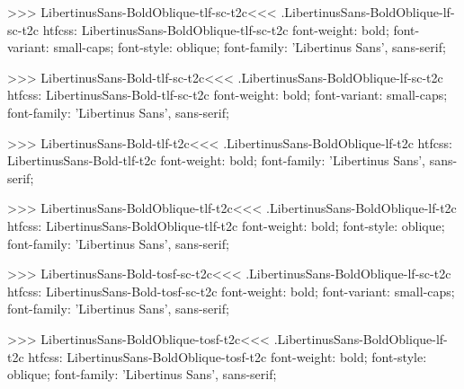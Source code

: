 {{{{{{{{{{>>>
\<LibertinusSans-BoldOblique-tlf-sc-t2c\><<<
.LibertinusSans-BoldOblique-lf-sc-t2c
htfcss:  LibertinusSans-BoldOblique-tlf-sc-t2c  font-weight: bold; font-variant: small-caps; font-style: oblique; font-family: 'Libertinus Sans', sans-serif;

>>>
\<LibertinusSans-Bold-tlf-sc-t2c\><<<
.LibertinusSans-BoldOblique-lf-sc-t2c
htfcss:  LibertinusSans-Bold-tlf-sc-t2c  font-weight: bold; font-variant: small-caps; font-family: 'Libertinus Sans', sans-serif;

>>>
\<LibertinusSans-Bold-tlf-t2c\><<<
.LibertinusSans-BoldOblique-lf-t2c
htfcss:  LibertinusSans-Bold-tlf-t2c  font-weight: bold; font-family: 'Libertinus Sans', sans-serif;

>>>
\<LibertinusSans-BoldOblique-tlf-t2c\><<<
.LibertinusSans-BoldOblique-lf-t2c
htfcss:  LibertinusSans-BoldOblique-tlf-t2c  font-weight: bold; font-style: oblique; font-family: 'Libertinus Sans', sans-serif;

>>>
\<LibertinusSans-Bold-tosf-sc-t2c\><<<
.LibertinusSans-BoldOblique-lf-sc-t2c
htfcss:  LibertinusSans-Bold-tosf-sc-t2c  font-weight: bold; font-variant: small-caps; font-family: 'Libertinus Sans', sans-serif;

>>>
\<LibertinusSans-BoldOblique-tosf-t2c\><<<
.LibertinusSans-BoldOblique-lf-t2c
htfcss:  LibertinusSans-BoldOblique-tosf-t2c  font-weight: bold; font-style: oblique; font-family: 'Libertinus Sans', sans-serif;

}}}}}}}}}}
